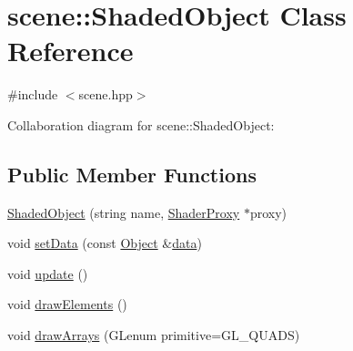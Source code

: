 \hypertarget{classscene_1_1_shaded_object}{}\section{scene\+:\+:Shaded\+Object Class Reference}
\label{classscene_1_1_shaded_object}


{\ttfamily \#include $<$scene.\+hpp$>$}



Collaboration diagram for scene\+:\+:Shaded\+Object\+:
\subsection*{Public Member Functions}
\begin{DoxyCompactItemize}
\item 
\mbox{\hyperlink{classscene_1_1_shaded_object_aab354d55310cec86396ec25078bfa572}{Shaded\+Object}} (string name, \mbox{\hyperlink{classshaderutils_1_1_shader_proxy}{Shader\+Proxy}} $\ast$proxy)
\item 
void \mbox{\hyperlink{classscene_1_1_shaded_object_ae8d489b0c25c74840b11e2ba6897f145}{set\+Data}} (const \mbox{\hyperlink{classscene_1_1_object}{Object}} \&\mbox{\hyperlink{classscene_1_1_shaded_object_ad5127e62295e11f3ae4af42e2e517bff}{data}})
\item 
void \mbox{\hyperlink{classscene_1_1_shaded_object_a44063851137c38331d1a5bc0921e5fe1}{update}} ()
\item 
void \mbox{\hyperlink{classscene_1_1_shaded_object_aadbd7f9e0b8575199125cd9c12faeab0}{draw\+Elements}} ()
\item 
void \mbox{\hyperlink{classscene_1_1_shaded_object_a496b9a1a88487535951fa058d14265f8}{draw\+Arrays}} (G\+Lenum primitive=G\+L\+\_\+\+Q\+U\+A\+DS)
\end{DoxyCompactItemize}
